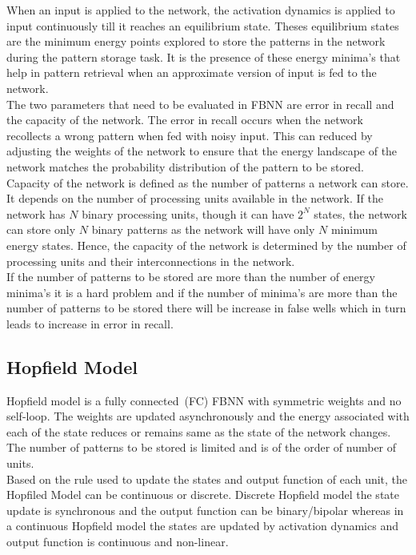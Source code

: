 \begin{spacing}{1.5}
When an input is applied to the network, the activation dynamics is applied to input continuously till it reaches an equilibrium state. Theses equilibrium states are the minimum energy points explored to store the patterns in the network during the pattern storage task. It is the presence of these energy minima’s that help in pattern retrieval when an approximate version of input is fed to the network. \\
The two parameters that need to be evaluated in FBNN are error in recall and the capacity of the network.
The error in recall occurs when the network recollects a wrong pattern when fed with noisy input. This can reduced by adjusting the weights of the network to ensure that the energy landscape of the network matches the probability distribution of the pattern to be stored.
Capacity of the network is defined as the number of patterns a network can store. It depends on the number of processing units available in the network. If the network has $N$ binary processing units, though it can have $2^N$ states, the network can store only $N$ binary patterns as the network will have only $N$ minimum energy states. Hence, the capacity of the network is determined by the number of processing units and their interconnections in the network. \\
If the number of patterns to be stored are more than the number of energy minima’s it is a hard problem and if the number of minima’s are more than the number of patterns to be stored there will be increase in false wells which in turn leads to increase in error in recall.

\subsection{Hopfield Model}
Hopfield model is a fully connected~(FC) FBNN with symmetric weights and no self-loop. The weights are updated asynchronously and the energy associated with each of the state reduces or remains same as the state of the network changes. The number of patterns to be stored is limited and is of the order of number of units.\\
Based on the rule used to update the states and output function of each unit, the Hopfiled Model can be continuous or discrete.
Discrete Hopfield model the state update is synchronous and the output function can be binary/bipolar whereas in a continuous Hopfield model the states are updated by activation dynamics and output function is continuous and non-linear.


\end{spacing}
